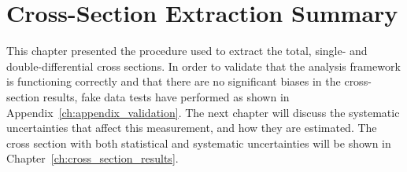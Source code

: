 \section{Cross-Section Extraction Summary}

This chapter presented the procedure used to extract the total, single- and double-differential cross sections.
In order to validate that the analysis framework is functioning correctly and that there are no significant biases in the cross-section results, fake data tests have performed as shown in Appendix~\ref{ch:appendix_validation}.
The next chapter will discuss the systematic uncertainties that affect this measurement, and how they are estimated. The cross section with both statistical and systematic uncertainties will be shown in Chapter~\ref{ch:cross_section_results}.








